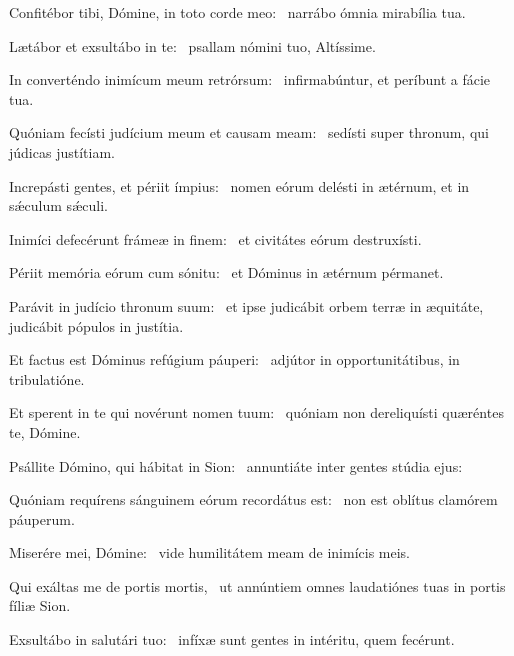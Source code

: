 \item Confitébor tibi, Dómine, in toto corde meo:~\psstar{} narrábo ómnia mirabília tua.

\item Lætábor et exsultábo in te:~\psstar{} psallam nómini tuo, Altíssime.

\item In converténdo inimícum meum retrórsum:~\psstar{} infirmabúntur, et períbunt a fácie tua.

\item Quóniam fecísti judícium meum et causam meam:~\psstar{} sedísti super thronum, qui júdicas justítiam.

\item Increpásti gentes, et périit ímpius:~\psstar{} nomen eórum delésti in ætérnum, et in sǽculum sǽculi.

\item Inimíci defecérunt frámeæ in finem:~\psstar{} et civitátes eórum destruxísti.

\item Périit memória eórum cum sónitu:~\psstar{} et Dóminus in ætérnum pérmanet.

\item Parávit in judício thronum suum:~\psstar{} et ipse judicábit orbem terræ in æquitáte, judicábit pópulos in justítia.

\item Et factus est Dóminus refúgium páuperi:~\psstar{} adjútor in opportunitátibus, in tribulatióne.

\item Et sperent in te qui novérunt nomen tuum:~\psstar{} quóniam non dereliquísti quæréntes te, Dómine.

\item Psállite Dómino, qui hábitat in Sion:~\psstar{} annuntiáte inter gentes stúdia ejus:

\item Quóniam requírens sánguinem eórum recordátus est:~\psstar{} non est oblítus clamórem páuperum.

\item Miserére mei, Dómine:~\psstar{} vide humilitátem meam de inimícis meis.

\item Qui exáltas me de portis mortis,~\psstar{} ut annúntiem omnes laudatiónes tuas in portis fíliæ Sion.

\item Exsultábo in salutári tuo:~\psstar{} infíxæ sunt gentes in intéritu, quem fecérunt.

